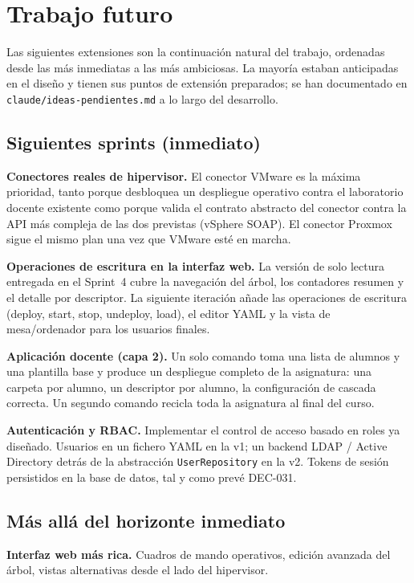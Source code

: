 \section{Trabajo futuro}
\label{sec:futuro-es}

Las siguientes extensiones son la continuación natural del trabajo,
ordenadas desde las más inmediatas a las más ambiciosas. La mayoría
estaban anticipadas en el diseño y tienen sus puntos de extensión
preparados; se han documentado en \texttt{claude/ideas-pendientes.md}
a lo largo del desarrollo.

\subsection{Siguientes sprints (inmediato)}

\textbf{Conectores reales de hipervisor.} El conector VMware es la
máxima prioridad, tanto porque desbloquea un despliegue operativo
contra el laboratorio docente existente como porque valida el
contrato abstracto del conector contra la API más compleja de las
dos previstas (vSphere SOAP). El conector Proxmox sigue el mismo
plan una vez que VMware esté en marcha.

\textbf{Operaciones de escritura en la interfaz web.} La versión
de solo lectura entregada en el Sprint~4 cubre la navegación del
árbol, los contadores resumen y el detalle por descriptor. La
siguiente iteración añade las operaciones de escritura (deploy,
start, stop, undeploy, load), el editor YAML y la vista de
mesa/ordenador para los usuarios finales.

\textbf{Aplicación docente (capa 2).} Un solo comando toma una lista
de alumnos y una plantilla base y produce un despliegue completo
de la asignatura: una carpeta por alumno, un descriptor por alumno,
la configuración de cascada correcta. Un segundo comando recicla
toda la asignatura al final del curso.

\textbf{Autenticación y RBAC.} Implementar el control de acceso
basado en roles ya diseñado. Usuarios en un fichero YAML en la v1;
un backend LDAP / Active Directory detrás de la abstracción
\texttt{UserRepository} en la v2. Tokens de sesión persistidos en
la base de datos, tal y como prevé DEC-031.

\subsection{Más allá del horizonte inmediato}

\textbf{Interfaz web más rica.} Cuadros de mando operativos,
edición avanzada del árbol, vistas alternativas desde el lado del
hipervisor.

